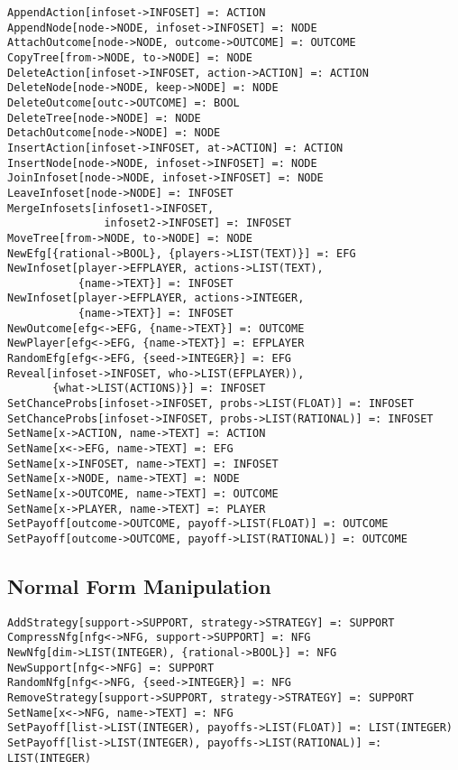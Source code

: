 \begin{verbatim}
AppendAction[infoset->INFOSET] =: ACTION
AppendNode[node->NODE, infoset->INFOSET] =: NODE
AttachOutcome[node->NODE, outcome->OUTCOME] =: OUTCOME
CopyTree[from->NODE, to->NODE] =: NODE
DeleteAction[infoset->INFOSET, action->ACTION] =: ACTION
DeleteNode[node->NODE, keep->NODE] =: NODE
DeleteOutcome[outc->OUTCOME] =: BOOL
DeleteTree[node->NODE] =: NODE
DetachOutcome[node->NODE] =: NODE
InsertAction[infoset->INFOSET, at->ACTION] =: ACTION
InsertNode[node->NODE, infoset->INFOSET] =: NODE
JoinInfoset[node->NODE, infoset->INFOSET] =: NODE
LeaveInfoset[node->NODE] =: INFOSET
MergeInfosets[infoset1->INFOSET,
               infoset2->INFOSET] =: INFOSET
MoveTree[from->NODE, to->NODE] =: NODE
NewEfg[{rational->BOOL}, {players->LIST(TEXT)}] =: EFG
NewInfoset[player->EFPLAYER, actions->LIST(TEXT),
           {name->TEXT}] =: INFOSET
NewInfoset[player->EFPLAYER, actions->INTEGER,
           {name->TEXT}] =: INFOSET
NewOutcome[efg<->EFG, {name->TEXT}] =: OUTCOME
NewPlayer[efg<->EFG, {name->TEXT}] =: EFPLAYER 
RandomEfg[efg<->EFG, {seed->INTEGER}] =: EFG
Reveal[infoset->INFOSET, who->LIST(EFPLAYER)),
       {what->LIST(ACTIONS)}] =: INFOSET
SetChanceProbs[infoset->INFOSET, probs->LIST(FLOAT)] =: INFOSET
SetChanceProbs[infoset->INFOSET, probs->LIST(RATIONAL)] =: INFOSET
SetName[x->ACTION, name->TEXT] =: ACTION
SetName[x<->EFG, name->TEXT] =: EFG
SetName[x->INFOSET, name->TEXT] =: INFOSET
SetName[x->NODE, name->TEXT] =: NODE
SetName[x->OUTCOME, name->TEXT] =: OUTCOME
SetName[x->PLAYER, name->TEXT] =: PLAYER
SetPayoff[outcome->OUTCOME, payoff->LIST(FLOAT)] =: OUTCOME
SetPayoff[outcome->OUTCOME, payoff->LIST(RATIONAL)] =: OUTCOME
\end{verbatim}

\subsection{Normal Form Manipulation}

\begin{verbatim}
AddStrategy[support->SUPPORT, strategy->STRATEGY] =: SUPPORT
CompressNfg[nfg<->NFG, support->SUPPORT] =: NFG
NewNfg[dim->LIST(INTEGER), {rational->BOOL}] =: NFG
NewSupport[nfg<->NFG] =: SUPPORT
RandomNfg[nfg<->NFG, {seed->INTEGER}] =: NFG
RemoveStrategy[support->SUPPORT, strategy->STRATEGY] =: SUPPORT
SetName[x<->NFG, name->TEXT] =: NFG
SetPayoff[list->LIST(INTEGER), payoffs->LIST(FLOAT)] =: LIST(INTEGER)
SetPayoff[list->LIST(INTEGER), payoffs->LIST(RATIONAL)] =: LIST(INTEGER)
\end{verbatim}

